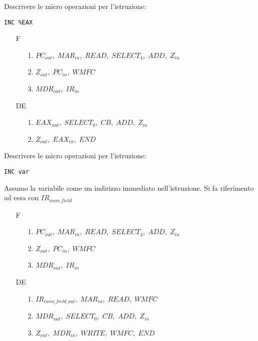\documentclass[a4paper]{article}
\theoremstyle{break}
\theoremstyle{break}
\theoremstyle{break}
\theoremstyle{break}
\begin{document}
\begin{exercise}
	Descrivere le micro operazioni per l'istruzione:
	\begin{center}
		\texttt{INC \%EAX}
	\end{center}

	\begin{enumerate}
		\item[F]
		      \begin{enumerate}
			      \item[1.] \( PC_{out},\; MAR_{in},\; READ ,\; SELECT_4,\; ADD,\; Z_{in}\)
			      \item[2.] \( Z_{out},\; PC_{in},\;WMFC \)
			      \item[3.] \( MDR_{out},\; IR_{in} \)
		      \end{enumerate}

		\item [DE]
		      \begin{enumerate}
			      \item[1.] \( EAX_{out},\; SELECT_0,\; CB,\; ADD,\; Z_{in} \)
			      \item[2.] \( Z_{out},\; EAX_{in},\; END \)
		      \end{enumerate}
	\end{enumerate}
\end{exercise}

\begin{exercise}
	Descrivere le micro operazioni per l'istruzione:
	\begin{center}
		\texttt{INC var}
	\end{center}
	Assumo la variabile come un indirizzo immediato nell'istruzione. Si fa
	riferimento ad essa con \( IR_{imm\_field} \)

	\begin{enumerate}
		\item[F]
		      \begin{enumerate}
			      \item[1.] \( PC_{out},\; MAR_{in},\; READ ,\; SELECT_4,\; ADD,\; Z_{in}\)
			      \item[2.] \( Z_{out},\; PC_{in},\;WMFC \)
			      \item[3.] \( MDR_{out},\; IR_{in} \)
		      \end{enumerate}

		\item [DE]
		      \begin{enumerate}
			      \item[1.] \( IR_{imm\_field\_out},\; MAR_{in},\; READ ,\; WMFC \)
			      \item[2.] \( MDR_{out},\; SELECT_0 ,\; CB ,\; ADD ,\; Z_{in} \)
			      \item [3.] \( Z_{out} ,\; MDR_{in} ,\; WRITE ,\; WMFC ,\; END \)
		      \end{enumerate}
	\end{enumerate}
\end{exercise}
\end{document}
